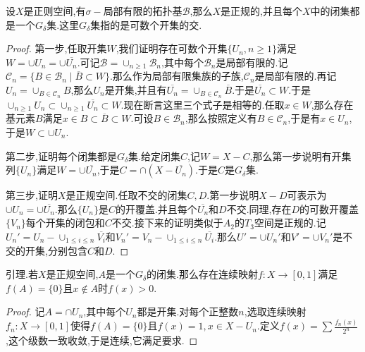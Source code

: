 设$X$是正则空间,有$\sigma-$局部有限的拓扑基$\mathscr{B}$,那么$X$是正规的,并且每个$X$中的闭集都是一个$G_{\delta}$集.这里$G_{\delta}$集指的是可数个开集的交.
\begin{proof}
	
	第一步,任取开集$W$,我们证明存在可数个开集$\{U_n,n\ge1\}$满足$W=\cup U_n=\cup\overline{U_n}$.可记$\mathscr{B}=\cup_{n\ge1}\mathscr{B}_n$,其中每个$\mathscr{B}_n$是局部有限的.记$\mathscr{C}_n=\{B\in\mathscr{B}_n\mid\overline{B}\subset W\}$.那么作为局部有限集族的子族,$\mathscr{C}_n$是局部有限的.再记$U_n=\cup_{B\in\mathscr{C}_n}B$,那么$U_n$是开集,并且有$\overline{U_n}=\cup_{B\in\mathscr{C}_n}\overline{B}$.于是$\overline{U_n}\subset W$.于是$\cup_{n\ge1}U_n\subset\cup_{n\ge1}\overline{U_n}\subset W$.现在断言这里三个式子是相等的.任取$x\in W$,那么存在基元素$B$满足$x\in B\subset\overline{B}\subset W$.可设$B\in\mathscr{B}_n$,那么按照定义有$B\in\mathscr{C}_n$,于是有$x\in U_n$,于是$W\subset\cup U_n$.
	
	第二步,证明每个闭集都是$G_{\delta}$集.给定闭集$C$,记$W=X-C$,那么第一步说明有开集列$\{U_n\}$满足$W=\cup\overline{U_n}$,于是$C=\cap(X-\overline{U_n})$.于是$C$是$G_{\delta}$集.
	
	第三步,证明$X$是正规空间.任取不交的闭集$C,D$.第一步说明$X-D$可表示为$\cup U_n=\cup\overline{U_n}$.那么$\{U_n\}$是$C$的开覆盖.并且每个$\overline{U_n}$和$D$不交.同理,存在$D$的可数开覆盖$\{V_n\}$每个开集的闭包和$C$不交.接下来的证明类似于$A_2$的$T_3$空间是正规的.记$U_n'=U_n-\cup_{1\le i\le n}\overline{V_i}$和$V_n'=V_n-\cup_{1\le i\le n}\overline{U_i}$.那么$U'=\cup U_n'$和$V'=\cup V_n'$是不交的开集,分别包含$C$和$D$.
\end{proof}

引理.若$X$是正规空间,$A$是一个$G_{\delta}$的闭集.那么存在连续映射$f:X\to[0,1]$满足$f(A)=\{0\}$且$x\not\in A$时$f(x)>0$.
\begin{proof}
	
	记$A=\cap U_n$,其中每个$U_n$都是开集.对每个正整数$n$,选取连续映射$f_n:X\to[0,1]$使得$f(A)=\{0\}$且$f(x)=1,x\in X-U_n$.定义$f(x)=\sum\frac{f_n(x)}{2^n}$,这个级数一致收敛,于是连续,它满足要求.
\end{proof}

